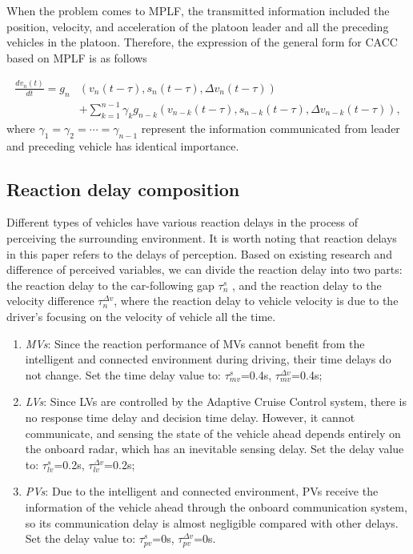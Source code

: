 \documentclass[journal]{IEEEtran}
\begin{document}
When the problem comes to MPLF, the transmitted information included the position, velocity, and acceleration of the platoon leader and all the preceding vehicles in the platoon. Therefore, the expression of the general form for CACC based on MPLF is as follows

\begin{equation}
\begin{aligned}
\frac{d v_{n}(t)}{d t}=g_{n} &\left(v_{n}(t-\tau), s_{n}(t-\tau), \Delta v_{n}(t-\tau)\right) \\
&+\sum_{k=1}^{n-1} \gamma_{k} g_{n-k}\left(v_{n-k}(t-\tau), s_{n-k}(t-\tau), \Delta v_{n-k}(t-\tau)\right),
\end{aligned}
\label{Eq4}
\end{equation}
where $\gamma_1=\gamma_2=\cdots	=\gamma_{n-1}$ represent the information communicated from leader and preceding vehicle has identical importance.

\subsection{Reaction delay composition}

Different types of vehicles have various reaction delays in the process of perceiving the surrounding environment\citep{ngoduy2013analytical}\citep{yao2021linear}. It is worth noting that reaction delays in this paper refers to the delays of perception. Based on existing research and difference of perceived variables, we can divide the reaction delay into two parts: the reaction delay to the car-following gap $\tau_n^s$ , and the reaction delay to the velocity difference $\tau_n^{\Delta v}$, where the reaction delay to vehicle velocity is due to the driver’s focusing on the velocity of vehicle all the time.

\begin{enumerate}
	\item \emph{MVs}: Since the reaction performance of MVs cannot benefit from the intelligent and connected environment during driving, their time delays do not change. Set the time delay value to: 
	$\tau_{mv}^{s}$=0.4s, $\tau_{mv}^{\Delta v}$=0.4s;
	\item \emph{LVs}: Since LVs are controlled by the Adaptive Cruise Control system, there is no response time delay and decision time delay. However, it cannot communicate, and sensing the state of the vehicle ahead depends entirely on the onboard radar, which has an inevitable sensing delay. Set the delay value to: $\tau_{lv}^{s}$=0.2s, $\tau_{lv}^{\Delta v}$=0.2s;
	\item \emph{PVs}: Due to the intelligent and connected environment, PVs receive the information of the vehicle ahead through the onboard communication system, so its communication delay is almost negligible compared with other delays. Set the delay value to: $\tau_{pv}^{s}$=0s, $\tau_{pv}^{\Delta v}$=0s.
\end{enumerate}
\end{document}
